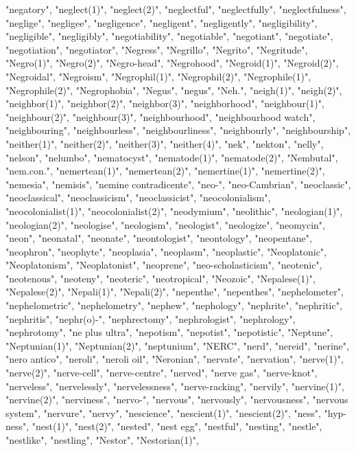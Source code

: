 "negatory",
"neglect(1)",
"neglect(2)",
"neglectful",
"neglectfully",
"neglectfulness",
"neglige",
"negligee",
"negligence",
"negligent",
"negligently",
"negligibility",
"negligible",
"negligibly",
"negotiability",
"negotiable",
"negotiant",
"negotiate",
"negotiation",
"negotiator",
"Negress",
"Negrillo",
"Negrito",
"Negritude",
"Negro(1)",
"Negro(2)",
"Negro-head",
"Negrohood",
"Negroid(1)",
"Negroid(2)",
"Negroidal",
"Negroism",
"Negrophil(1)",
"Negrophil(2)",
"Negrophile(1)",
"Negrophile(2)",
"Negrophobia",
"Negus",
"negus",
"Neh.",
"neigh(1)",
"neigh(2)",
"neighbor(1)",
"neighbor(2)",
"neighbor(3)",
"neighborhood",
"neighbour(1)",
"neighbour(2)",
"neighbour(3)",
"neighbourhood",
"neighbourhood watch",
"neighbouring",
"neighbourless",
"neighbourliness",
"neighbourly",
"neighbourship",
"neither(1)",
"neither(2)",
"neither(3)",
"neither(4)",
"nek",
"nekton",
"nelly",
"nelson",
"nelumbo",
"nematocyst",
"nematode(1)",
"nematode(2)",
"Nembutal",
"nem.con.",
"nemertean(1)",
"nemertean(2)",
"nemertine(1)",
"nemertine(2)",
"nemesia",
"nemisis",
"nemine contradicente",
"neo-",
"neo-Cambrian",
"neoclassic",
"neoclassical",
"neoclassicism",
"neoclassicist",
"neocolonialism",
"neocolonialist(1)",
"neocolonialist(2)",
"neodymium",
"neolithic",
"neologian(1)",
"neologian(2)",
"neologise",
"neologism",
"neologist",
"neologize",
"neomycin",
"neon",
"neonatal",
"neonate",
"neontologist",
"neontology",
"neopentane",
"neophron",
"neophyte",
"neoplasia",
"neoplasm",
"neoplastic",
"Neoplatonic",
"Neoplatonism",
"Neoplatonist",
"neoprene",
"neo-scholasticism",
"neotenic",
"neotenous",
"neoteny",
"neoteric",
"neotropical",
"Neozoic",
"Nepalese(1)",
"Nepalese(2)",
"Nepali(1)",
"Nepali(2)",
"nepenthe",
"nepenthes",
"nephelometer",
"nephelometric",
"nephelometry",
"nephew",
"nephology",
"nephrite",
"nephritic",
"nephritis",
"nephr(o)-",
"nephrectomy",
"nephrologist",
"nephrology",
"nephrotomy",
"ne plus ultra",
"nepotism",
"nepotist",
"nepotistic",
"Neptune",
"Neptunian(1)",
"Neptunian(2)",
"neptunium",
"NERC",
"nerd",
"nereid",
"nerine",
"nero antico",
"neroli",
"neroli oil",
"Neronian",
"nervate",
"nervation",
"nerve(1)",
"nerve(2)",
"nerve-cell",
"nerve-centre",
"nerved",
"nerve gas",
"nerve-knot",
"nerveless",
"nervelessly",
"nervelessness",
"nerve-racking",
"nervily",
"nervine(1)",
"nervine(2)",
"nerviness",
"nervo-",
"nervous",
"nervously",
"nervousness",
"nervous system",
"nervure",
"nervy",
"nescience",
"nescient(1)",
"nescient(2)",
"ness",
"hyp-ness",
"nest(1)",
"nest(2)",
"nested",
"nest egg",
"nestful",
"nesting",
"nestle",
"nestlike",
"nestling",
"Nestor",
"Nestorian(1)",

